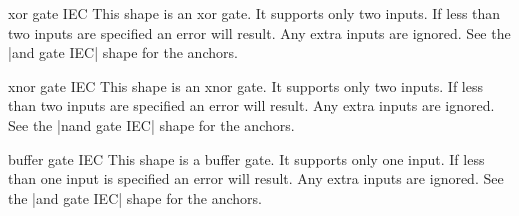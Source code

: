 \begin{shape}{xor gate IEC}
  This shape is an xor gate. It supports only two inputs.
   If less than two inputs are specified an error will result.
  Any extra inputs are ignored.  
		See the |and gate IEC| shape for the anchors.
	
\begin{codeexample}[]
\end{codeexample}

\end{shape}


\begin{shape}{xnor gate IEC}
  This shape is an xnor gate. It supports only two inputs.
  If less than two inputs are specified an error will result.
  Any extra inputs are ignored.  
	See the |nand gate IEC| shape for the anchors.
	
\begin{codeexample}[]
\end{codeexample}

\end{shape}

\begin{shape}{buffer gate IEC}
   This shape is a buffer gate. It supports only one input.
  If less than one input is specified an error will result.
  Any extra inputs are ignored. 
	See the |and gate IEC| shape for the anchors.

\begin{codeexample}[]
\end{codeexample}

\end{shape}


